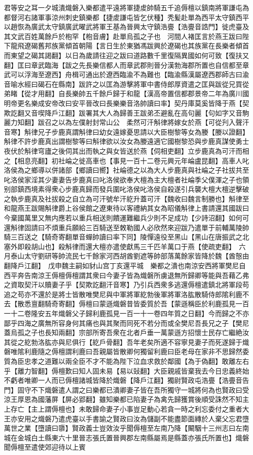 君等安之耳一夕城潰熾磐入樂都遣平遠將軍捷䖍帥騎五千追傉檀以鎮南將軍謙屯為都督河右諸軍事涼州刺史鎮樂都【捷䖍謙屯皆乞伏種】秃髪赴單為西平太守鎮西平以趙恢為廣武太守鎮廣武曜武將軍王基為晉興太守鎮浩亹【浩亹音誥門】徙虎臺及其文武百姓萬餘戶於枹罕【枹音膚】赴單烏孤之子也　河間人褚匡言於燕王跋曰陛下龍飛遼碣舊邦族黨傾首朝陽【言日生於東猶馮跋興於遼碣也其族黨在長樂者傾首而東望之碣其謁翻】以日為歲請往迎之跋曰道路數千里復隔異國如何可致【復扶又翻】匡曰章武臨海【跋之先長樂信都人而章武郡則晉分漢勃海郡所置也自信都至章武可以浮海至遼西】舟楫可通出於遼西臨渝不為難也【臨渝縣漢屬遼西郡師古曰渝音喻水經曰碣石在縣南】跋許之以匡為游擊將軍中書侍郎厚資遣之匡與跋從兄買從弟睹【從才用翻】自長樂帥五千餘戶歸于和龍【漢高帝置信都郡景帝二年為廣川國明帝更名樂成安帝改曰安平晉改曰長樂樂音洛帥讀曰率】契丹庫莫奚皆降于燕【契欺訖翻又音喫降戶江翻】跋署其大人為歸善王跋弟丕避亂在高句麗【句如字又音駒麗力知翻】跋召之以為左僕射封常山公　柔然可汗斛律將嫁女於燕【可從刋入聲汗音寒】斛律兄子步鹿真謂斛律曰幼女遠嫁憂思請以大臣樹黎等女為媵【媵以證翻】斛律不許步鹿真出謂樹黎等曰斛律欲以汝女為媵遠適它國樹黎恐與步鹿真謀使勇士夜伏於斛律穹廬之後伺其出而執之與女皆送於燕【伺相吏翻】立步鹿真為可汗而相之【相息亮翻】初社崘之徙高車也【事見一百十二卷元興元年崘盧昆翻】高車人叱洛侯為之鄉導以併諸部【鄉讀曰嚮】社崘德之以為大人步鹿真與社崘之子社拔共至叱洛侯家淫其少妻妻告步鹿真曰叱洛侯欲奉大檀為主大檀者社崘季父僕渾之子也領别部鎮西境素得衆心步鹿真歸而發兵圍叱洛侯叱洛侯自殺遂引兵襲大檀大檀逆擊破之執步鹿真及社拔殺之自立為可汗號牟汗紇升蓋可汗【魏收曰魏言制勝也】斛律至和龍燕王跋賜斛律爵上谷侯館之遼東待以客禮納其女為昭儀斛律上書請還其國跋曰今棄國萬里又無内應若以重兵相送則饋運難繼兵少則不足成功【少詩沼翻】如何可還斛律固請曰不煩重兵願給三百騎送至敇勒國人必欣然來迎跋乃遣單于前輔萬陵帥騎三百送之【騎奇寄翻單音蟬帥讀曰率下同】陵憚遠役至黑山【黑山在唐振武之北塞外即殺胡山也】殺斛律而還大檀亦遣使獻馬三千匹羊萬口于燕【使疏吏翻】　六月泰山太守劉研等帥流民七千餘家河西胡酋劉遮等帥部落萬餘家皆降於魏【酋慤由翻降戶江翻】　戊申魏主嗣如豺山宫丁亥還平城　樂都之潰也南涼安西將軍樊尼自西平奔告南涼王傉檀傉檀謂其衆曰今妻子皆為熾磐所虜退無所歸卿等能與吾藉乙弗之資取契汗以贖妻子乎【契欺訖翻汗音寒】乃引兵西衆多逃還傉檀遣鎮北將軍段苟追之苟亦不還於是將士皆散唯樊尼與中軍將軍紇勃後軍將軍洛肱散騎侍郎隂利鹿不去【散悉亶翻騎奇寄翻】傉檀曰蒙遜熾磐昔皆委質於吾【蒙遜稱臣於利鹿孤見一百一十二卷隆安五年熾磐父子歸利鹿孤見一百一十一卷四年質之日翻】今而歸之不亦鄙乎四海之廣無所容身何其痛也與其聚而同死不若分而或全樊尼吾長兄之子【樊尼蓋烏孤之子也長知兩翻】宗部所寄吾衆在北者戶垂一萬蒙遜方招懷士民存亡繼絶汝其從之紇勃洛肱亦與尼俱行【紇戶骨翻】吾年老矣所適不容寧見妻子而死遂歸于熾磐唯隂利鹿隨之傉檀謂利鹿曰吾親屬皆散卿何獨留利鹿曰臣老母在家非不思歸然委質為臣忠孝之道難以兩全臣不才不能為陛下泣血求救於鄰國【為于偽翻】敢離左右乎【離力智翻】傉檀歎曰知人固未易【易以䜴翻】大臣親戚皆棄我去今日忠義終始不虧者唯卿一人而已傉檀諸城皆降於熾磐【降戶江翻】獨尉賢政屯浩亹【浩亹音告門】固守不下熾磐遣人謂之曰樂都已潰卿妻子皆在吾所獨守一城將何為也賢政曰受涼王厚恩為國藩屏【屏必郢翻】雖知樂都已陷妻子為禽先歸獲賞後順受誅然不知主上存亡【主上謂傉檀也】未敢歸命妻子小事豈足動心若貪一時之利忘委付之重者大王亦安用之熾磐乃遣虎臺以手書諭之賢政曰汝為儲副不能盡節面縳於人棄父忘君墮萬世之業【墮讀曰隳】賢政義士豈效汝乎聞傉檀至左南乃降【闞駰十三州志曰左南城在金城白土縣東六十里晉志張氏置晉興郡左南縣屬焉是縣蓋亦張氏所置也】熾磐聞傉檀至遣使郊迎待以上賓